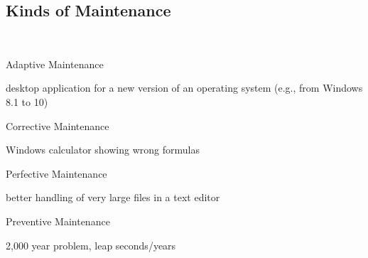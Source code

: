 \subsection{Kinds of Maintenance}
\begin{frame}{\insertsubsection\ \mytitlesource{\ludewiglichter}} %
	\begin{fancycolumns}
		\begin{definition}{Adaptive Maintenance \mysource{\lientzswanson}}
			 \hfill {}
		\end{definition}
		\begin{example}{}
			desktop application for a new version of an operating system (e.g., from Windows 8.1 to 10)
		\end{example}
		\begin{definition}{Corrective Maintenance \mysource{\lientzswanson}}
			 \hfill {}
		\end{definition}
		\begin{example}{}
			Windows calculator showing wrong formulas
		\end{example}
		\nextcolumn
		\begin{definition}{Perfective Maintenance \mysource{\lientzswanson}}
			 \hfill {}
		\end{definition}
		\begin{example}{}
			better handling of very large files in a text editor
		\end{example}
		\begin{definition}{Preventive Maintenance \mysource{\lientzswanson}}
			 \hfill {}
		\end{definition}
		\begin{example}{}
			2,000 year problem, leap seconds/years
		\end{example}
	\end{fancycolumns}
\end{frame}


